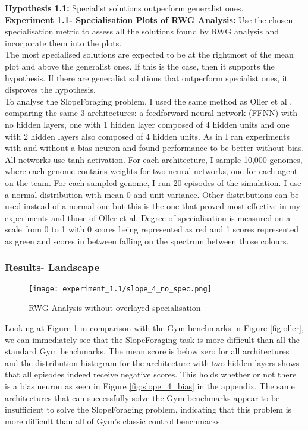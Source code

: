 \documentclass[12pt]{article}
\begin{document}
\textbf{Hypothesis 1.1:} Specialist solutions outperform generalist ones.\\

\textbf{Experiment 1.1- Specialisation Plots of RWG Analysis:}  Use the chosen specialisation metric to assess all the solutions found by RWG analysis and incorporate them into the plots.\\

The most specialised solutions are expected to be at the rightmost of the mean plot and above the generalist ones.
If this is the case, then it supports the hypothesis.
If there are generalist solutions that outperform specialist ones, it disproves the hypothesis.\\

To analyse the SlopeForaging problem, I used the same method as Oller et al \cite{oller:AAMAS:2020}, comparing the same 3 architectures: a feedforward neural network (FFNN) with no hidden layers, one with 1 hidden layer composed of 4 hidden units and one with 2 hidden layers also composed of 4 hidden units.
As in  \cite{oller:AAMAS:2020} I ran experiments with and without a bias neuron and found performance to be better without bias.
All networks use tanh activation.
For each architecture, I sample 10,000 genomes, where each genome contains weights for two neural networks, one for each agent on the team.
For each sampled genome, I run 20 episodes of the simulation.
I use a normal distribution with mean 0 and unit variance.
Other distributions can be used instead of a normal one but this is the one that proved most effective in my experiments and those of Oller et al.
Degree of specialisation is measured on a scale from 0 to 1 with 0 scores being represented as red and 1 scores represented as green and scores in between falling on the spectrum between those colours.\\

\subsubsection{Results- Landscape}

\begin{figure}[h]
\centering
\texttt{[image: experiment\_1.1/slope\_4\_no\_spec.png]}
\caption{RWG Analysis without overlayed specialisation}
\label{fig:slope_4_no_spec}
\end{figure}

Looking at Figure \ref{fig:slope_4_no_spec} in comparison with the Gym benchmarks in Figure \ref{fig:oller}, we can immediately see that the SlopeForaging task is more difficult than all the standard Gym benchmarks.
The mean score is below zero for all architectures and the distribution histogram for the architecture with two hidden layers shows that all episodes indeed receive negative scores.
This holds whether or not there is a bias neuron as seen in Figure \ref{fig:slope_4_bias} in the appendix.
The same architectures that can successfully solve the Gym benchmarks appear to be insufficient to solve the SlopeForaging problem, indicating that this problem is more difficult than all of Gym's classic control benchmarks.\\
\end{document}
